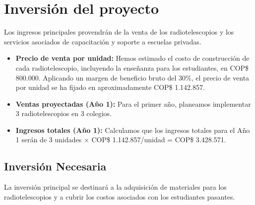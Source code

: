 \section{Inversión del proyecto} 

Los ingresos principales provendrán de la venta de los radiotelescopios y los 
servicios asociados de capacitación y soporte a escuelas privadas.

\begin{itemize}
    \item \textbf{Precio de venta por unidad:} Hemos estimado el costo de 
			construcción de cada radiotelescopio, incluyendo la enseñanza para los 
			estudiantes, en COP\$ 800.000. Aplicando un margen de beneficio bruto del 
			30\%, el precio de venta por unidad se ha fijado en aproximadamente 
			COP\$ 1.142.857.
    \item \textbf{Ventas proyectadas (Año 1):} Para el primer año, planeamos 
			implementar 3 radiotelescopios en 3 colegios.
    \item \textbf{Ingresos totales (Año 1):} Calculamos que los ingresos 
			totales para el Año 1 serán de 3 unidades 
			$\times$ COP\$ 1.142.857/unidad = COP\$ 3.428.571.
\end{itemize}

\subsection*{Inversión Necesaria}

La inversión principal se destinará a la adquisición de materiales para los 
radiotelescopios y a cubrir los costos asociados con los estudiantes pasantes.

